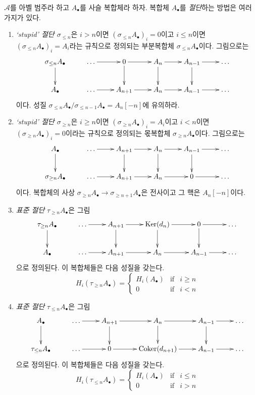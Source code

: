 \noindent
$\mathcal{A}$를 아벨 범주라 하고 $A_\bullet$를 사슬 복합체라 하자.
복합체 $A_\bullet$를 {\it 절단}하는 방법은 여러 가지가 있다.
\begin{enumerate}
\item {\it ‘stupid’ 절단 $\sigma_{\leq n}$}은
$i > n$이면 $(\sigma_{\leq n} A_\bullet)_i = 0$이고
$i \leq n$이면 $(\sigma_{\leq n} A_\bullet)_i = A_i$라는 규칙으로
정의되는 부분복합체 $\sigma_{\leq n} A_\bullet$이다. 그림으로는
$$
\xymatrix{
\sigma_{\leq n}A_\bullet \ar[d]  &
\ldots \ar[r] &
0 \ar[r] \ar[d] &
A_n \ar[r] \ar[d] &
A_{n - 1} \ar[r] \ar[d] &
\ldots \\
A_\bullet  &
\ldots \ar[r] &
A_{n + 1} \ar[r] &
A_n \ar[r] &
A_{n - 1} \ar[r] &
\ldots
}
$$
이다. 성질
$\sigma_{\leq n}A_\bullet / \sigma_{\leq n - 1}A_\bullet = A_n[-n]$에
유의하라.
\item {\it ‘stupid’ 절단 $\sigma_{\geq n}$}은
$i \geq n$이면 $(\sigma_{\geq n} A_\bullet)_i = A_i$이고
$i < n$이면 $(\sigma_{\geq n} A_\bullet)_i = 0$이라는 규칙으로
정의되는 몫복합체 $\sigma_{\geq n} A_\bullet$이다. 그림으로는
$$
\xymatrix{
A_\bullet \ar[d]  &
\ldots \ar[r] &
A_{n + 1} \ar[r] \ar[d] &
A_n \ar[r] \ar[d] &
A_{n - 1} \ar[r] \ar[d] &
\ldots \\
\sigma_{\geq n}A_\bullet  &
\ldots \ar[r] &
A_{n + 1} \ar[r] &
A_n \ar[r] &
0 \ar[r] &
\ldots
}
$$
이다. 복합체의 사상
$\sigma_{\geq n}A_\bullet \to \sigma_{\geq n + 1}A_\bullet$은
전사이고 그 핵은 $A_n[-n]$이다.
\item {\it 표준 절단} $\tau_{\geq n}A_\bullet$은 그림
$$
\xymatrix{
\tau_{\geq n}A_\bullet \ar[d]  &
\ldots \ar[r] &
A_{n + 1} \ar[r] \ar[d] &
\Ker(d_n) \ar[r] \ar[d] &
0 \ar[r] \ar[d] &
\ldots \\
A_\bullet  &
\ldots \ar[r] &
A_{n + 1} \ar[r] &
A_n \ar[r] &
A_{n - 1} \ar[r] &
\ldots
}
$$
으로 정의된다. 이 복합체들은 다음 성질을 갖는다.
$$
H_i(\tau_{\geq n}A_\bullet) =
\left\{
\begin{matrix}
H_i(A_\bullet) & \text{if} & i \geq n \\
0 & \text{if} & i < n
\end{matrix}
\right.
$$
\item {\it 표준 절단} $\tau_{\leq n}A_\bullet$은 그림
$$
\xymatrix{
A_\bullet \ar[d]  &
\ldots \ar[r] &
A_{n + 1} \ar[r] \ar[d] &
A_n \ar[r] \ar[d] &
A_{n - 1} \ar[r] \ar[d] &
\ldots \\
\tau_{\leq n}A_\bullet  &
\ldots \ar[r] &
0 \ar[r] &
\Coker(d_{n + 1}) \ar[r] &
A_{n - 1} \ar[r] &
\ldots
}
$$
으로 정의된다. 이 복합체들은 다음 성질을 갖는다.
$$
H_i(\tau_{\leq n}A_\bullet) =
\left\{
\begin{matrix}
H_i(A_\bullet) & \text{if} & i \leq n \\
0 & \text{if} & i > n
\end{matrix}
\right.
$$
\end{enumerate}


